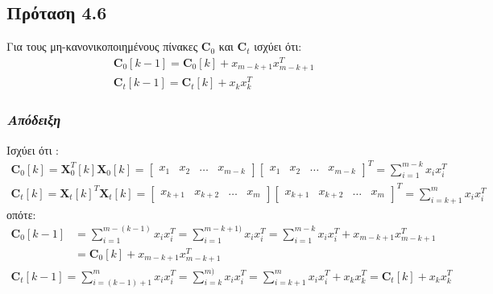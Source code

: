 \subsection*{\small{Πρόταση 4.6}}
Για τους μη-κανονικοποιημένους πίνακες $\mathbf{C}_0$ και $\mathbf{C}_t$ ισχύει ότι:
\begin{align} 
&\mathbf{C}_0[k-1] = \mathbf{C}_0[k] + x_{m-k+1} x_{m-k+1}^T \label{eq:4.2.3}\\
&\mathbf{C}_t[k-1] = \mathbf{C}_t[k] + x_k x_k^T \label{eq:4.2.4}
\end{align}
\subsubsection*{\small{\textit{Απόδειξη}}}
Ισχύει ότι :
\begin{align*}
\mathbf{C}_0[k] = \mathbf{X}_0^T[k] \mathbf{X}_0[k] = 
\begin{bmatrix}
x_1 & x_2 & \ldots & x_{m-k}
\end{bmatrix}
\begin{bmatrix}
x_1 & x_2 & \ldots & x_{m-k}
\end{bmatrix}^T = \sum\limits_{i=1}^{m-k} x_i x_i^T
\end{align*}
\begin{align*}
\mathbf{C}_t[k] = \mathbf{X}_t[k]^T \mathbf{X}_t[k] = 
\begin{bmatrix}
x_{k+1} & x_{k+2} & \ldots & x_m
\end{bmatrix}
\begin{bmatrix}
x_{k+1} & x_{k+2} & \ldots & x_m
\end{bmatrix}^T = \sum \limits_{i=k+1}^{m} x_i x_i^T
\end{align*}
οπότε:
\begin{align*}
\mathbf{C}_0[k-1] &= \sum \limits_{i=1}^{m-(k-1)} x_i x_i^T = 
\sum \limits_{i=1}^{m-k+1)} x_i x_i^T = \sum \limits_{i=1}^{m-k} x_i x_i^T + x_{m-k+1} x_{m-k+1}^T\\ 
&= \mathbf{C}_0[k] + x_{m-k+1} x_{m-k+1}^T
\end{align*}
\begin{align*}
\mathbf{C}_t[k-1] = \sum \limits_{i=(k-1)+1}^{m} x_i x_i^T = 
\sum \limits_{i=k}^{m)} x_i x_i^T = \sum \limits_{i=k+1}^{m} x_i x_i^T + x_{k} x_{k}^T= \mathbf{C}_t[k] + x_{k} x_{k}^T
\end{align*}
